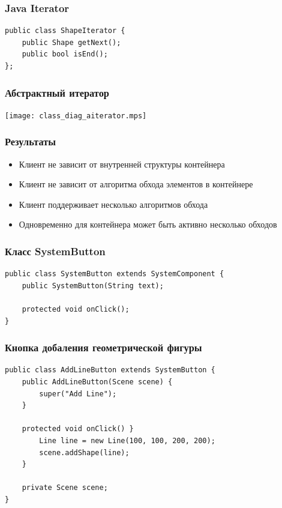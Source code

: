 \documentclass[handout]{beamer}
\begin{document}
\begin{frame}[fragile]
\frametitle{Java Iterator}
\begin{lstlisting}
public class ShapeIterator {
    public Shape getNext();
    public bool isEnd();
};
\end{lstlisting}
\end{frame}



\begin{frame}[fragile]
\frametitle{Абстрактный итератор}
\begin{center}
\texttt{[image: class\_diag\_aiterator.mps]}
\end{center}
\end{frame}


\begin{frame}[fragile]
\frametitle{Результаты}
\begin{itemize}
\item Клиент не зависит от внутренней структуры контейнера
\item Клиент не зависит от алгоритма обхода элементов в контейнере
\item Клиент поддерживает несколько алгоритмов обхода
\item Одновременно для контейнера может быть активно несколько обходов
\end{itemize}
\end{frame}


\begin{frame}[fragile]
\frametitle{Класс SystemButton}
\begin{lstlisting}
public class SystemButton extends SystemComponent {
    public SystemButton(String text);

    protected void onClick();
}
\end{lstlisting}
\end{frame}


\begin{frame}[fragile]
\frametitle{Кнопка добаления геометрической фигуры}
\begin{lstlisting}
public class AddLineButton extends SystemButton {
    public AddLineButton(Scene scene) {
        super("Add Line");
    }

    protected void onClick() }
        Line line = new Line(100, 100, 200, 200);
        scene.addShape(line);
    }

    private Scene scene;
}
\end{lstlisting}
\end{frame}
\end{document}
